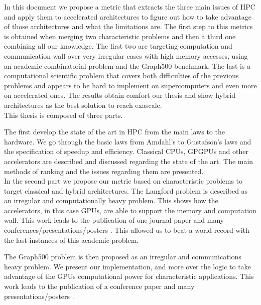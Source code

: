 In this document we propose a metric that extracts the three main issues of HPC and apply them to accelerated architectures to figure out how to take advantage of those architectures and what the limitations are. 
The first step to this metrics is obtained when merging two characteristic problems and then a third one combining all our knowledge.
The first two are targeting computation and communication wall over very irregular cases with high memory accesses, using an academic combinatorial problem and the Graph500 benchmark. 
The last is a computational scientific problem that covers both difficulties of the previous problems and appears to be hard to implement on supercomputers and even more on accelerated ones.
The results obtain comfort our thesis and show hybrid architectures as the best solution to reach exascale.\\

This thesis is composed of three parts.

The first develop the state of the art in HPC from the main laws to the hardware. 	
We go through the basic laws from Amdahl's to Gustafson's laws and the specification of speedup and efficiency.
Classical CPUs, GPGPUs and other accelerators are described and discussed regarding the state of the art. 
The main methods of ranking and the issues regarding them are presented.\\ 

In the second part we propose our metric based on characteristic problems to target classical and hybrid architectures.
The Langford problem is described as an irregular and computationally heavy problem.
This shows how the accelerators, in this case GPUs, are able to support the memory and computation wall. 
This work leads to the publication of one journal paper \cite{krajecki2016many} and many conferences/presentations/posters \cite{deleau2014towards,j2016resolution,jaillet2014Langford}.
This allowed us to beat a world record with the last instances of this academic problem.

The Graph500 problem is then proposed as an irregular and communications heavy problem. 
We present our implementation, and more over the logic to take advantage of the GPUs computational power for characteristic applications. 
This work leads to the publication of a conference paper \cite{krajecki2016bfs} and many presentations/posters \cite{loiseau2015parcours,loiseau2015GTC}.\\

